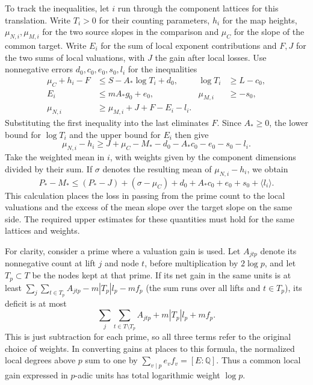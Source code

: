 \documentclass[11pt]{amsart}
\theoremstyle{definition}
\theoremstyle{remark}
\begin{document}
To track the inequalities, let $i$ run through the component
lattices for this translation. Write $T_i>0$ for their counting
parameters, $h_i$ for the map heights, $\mu_{N,i},\mu_{M,i}$ for
the two source slopes in the comparison and $\mu_C$ for the
slope of the common target. Write $E_i$ for the sum of local
exponent contributions and $F,J$ for the two sums of local
valuations, with $J$ the gain after local losses. Use
nonnegative errors $d_0,c_0,e_0,s_0,l_i$ for the inequalities
\[
 \begin{aligned}
 \mu_C+h_i-F&\le S-A_*\log T_i+d_0,&
 \log T_i&\ge L-c_0,\\
 E_i&\le mA_*g_0+e_0,& \mu_{M,i}&\ge-s_0,\\
 \mu_{N,i}&\ge\mu_{M,i}+J+F-E_i-l_i .
 \end{aligned}
\]
Substituting the first inequality into the last eliminates $F$.
Since $A_*\ge0$, the lower bound for $\log T_i$ and the upper
bound for $E_i$ then give
\[
 \mu_{N,i}-h_i\ge J+\mu_C-M_*-d_0-A_*c_0-e_0-s_0-l_i .
\]
Take the weighted mean in $i$, with weights given by the component
dimensions divided by their sum. If $\sigma$ denotes the resulting
mean of $\mu_{N,i}-h_i$, we obtain
\[
 P_*-M_*\le (P_*-J)+(\sigma-\mu_C)
              +d_0+A_*c_0+e_0+s_0+\langle l_i\rangle .
\]
This calculation places the loss in passing from the prime count
to the local valuations and the excess of the mean slope over the
target slope on the same side. The required upper estimates for
these quantities must hold for the same lattices and weights.

For clarity, consider a prime where a valuation gain is used.
Let $A_{jtp}$ denote its nonnegative count at lift $j$ and node
$t$, before multiplication by $2\log p$, and let $T_p\subset T$
be the nodes kept at that prime. If its net gain in the same units
is at least $\sum_j\sum_{t\in T_p} A_{jtp}-m|T_p|l_p-mf_p$
(the sum runs over all lifts and $t\in T_p$), its deficit is at
most
\[
 \sum_j\sum_{t\in T\setminus T_p} A_{jtp}+m|T_p|l_p+mf_p .
\]
This is just subtraction for each prime, so all three terms refer
to the original choice of weights. In converting gains at places
to this formula, the normalized local degrees above $p$ sum to
one by $\sum_{v\mid p}e_v f_v=[E:\mathbb Q]$. Thus a common
local gain expressed in $p$-adic units has total logarithmic
weight $\log p$.
\end{document}
